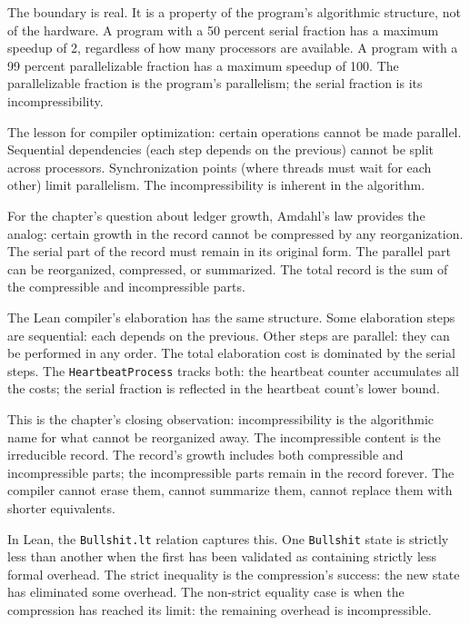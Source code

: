 The boundary is real. It is a property of the program's
algorithmic structure, not of the hardware. A program with a 50
percent serial fraction has a maximum speedup of 2, regardless of
how many processors are available. A program with a 99 percent
parallelizable fraction has a maximum speedup of 100. The
parallelizable fraction is the program's parallelism; the serial
fraction is its incompressibility.

The lesson for compiler optimization: certain operations cannot
be made parallel. Sequential dependencies (each step depends on
the previous) cannot be split across processors. Synchronization
points (where threads must wait for each other) limit
parallelism. The incompressibility is inherent in the algorithm.

For the chapter's question about ledger growth, Amdahl's law
provides the analog: certain growth in the record cannot be
compressed by any reorganization. The serial part of the record
must remain in its original form. The parallel part can be
reorganized, compressed, or summarized. The total record is the
sum of the compressible and incompressible parts.

The Lean compiler's elaboration has the same structure. Some
elaboration steps are sequential: each depends on the previous.
Other steps are parallel: they can be performed in any order.
The total elaboration cost is dominated by the serial steps. The
\texttt{HeartbeatProcess} tracks both: the heartbeat counter
accumulates all the costs; the serial fraction is reflected in
the heartbeat count's lower bound.

This is the chapter's closing observation: incompressibility is
the algorithmic name for what cannot be reorganized away. The
incompressible content is the irreducible record. The record's
growth includes both compressible and incompressible parts; the
incompressible parts remain in the record forever. The compiler
cannot erase them, cannot summarize them, cannot replace them
with shorter equivalents.

In Lean, the \texttt{Bullshit.lt} relation captures this. One
\texttt{Bullshit} state is strictly less than another when the
first has been validated as containing strictly less formal
overhead. The strict inequality is the compression's success: the
new state has eliminated some overhead. The non-strict equality
case is when the compression has reached its limit: the
remaining overhead is incompressible.

